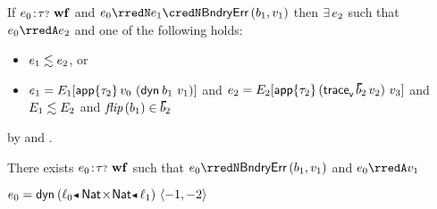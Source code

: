 \begin{theorem}
  If\/ $e_0\!:\!{\tau{\scriptstyle ?}}~\mathbf{wf}$
  and\/ $\sexpr_0 \rredN \sexpr_1 \credN \boundaryerror{\sbnd_1}{\svalue_1}$
  then\/ $\exists\,e_2$ such that $\sexpr_0 \rredA \sexpr_2$ and one of the following holds:
  \begin{itemize}
    \item
      $e_1 \lesssim e_2$, or
    \item
      $e_1 = E_1[\mathsf{app}{\{\tau_2\}}\,v_0~(\mathsf{dyn}^{}\,b_1~v_1)]$
      and\/ $\sexpr_2 \eeq \ctx_2[\eapp{\stype_2}{(\ehist{\sblist_2}{\svalue_2})}{\svalue_3}]$
      and\/ $E_1 \lesssim E_2$ and $\fflip{\sbnd_1} \in \sblist_2$
  \end{itemize}
\end{theorem}
\begin{lamportproof}
  by  and .
\end{lamportproof}

\begin{example}
  There exists\/ $e_0\!:\!{\tau{\scriptstyle ?}}~\mathbf{wf}$
  such that\/ $\sexpr_0 \rredN \boundaryerror{\sbnd_1}{\svalue_1}$
  and\/ $\sexpr_0 \rredA \svalue_1$
\end{example}
\begin{lamportproof}
  $\sexpr_0 \eeq \edynb{\obnd{\sowner_0}{\tpair{\tnat}{\tnat}}{\sowner_1}}{\epair{-1}{{-2}}}$
\end{lamportproof}

